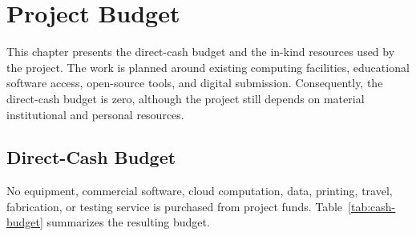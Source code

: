 \chapter{Project Budget}
\label{chap:budget}

This chapter presents the direct-cash budget and the in-kind resources used by
the project. The work is planned around existing computing facilities,
educational software access, open-source tools, and digital submission.
Consequently, the direct-cash budget is zero, although the project still
depends on material institutional and personal resources.

\section{Direct-Cash Budget}
\label{sec:budget}

No equipment, commercial software, cloud computation, data, printing, travel,
fabrication, or testing service is purchased from project funds.
Table~\ref{tab:cash-budget} summarizes the resulting budget.

